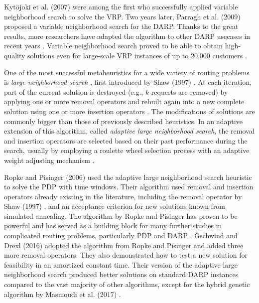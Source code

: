 Kytöjoki et al. (2007) \cite{KYTOJOKI2007} were among the first who successfully applied variable neighborhood search to solve the VRP. Two years later, Parragh et al. (2009) \cite{Parragh2009} proposed a variable neighborhood search for the DARP. Thanks to the great results, more researchers have adapted the algorithm to other DARP usecases in recent years \cite{SCHILDE2011, SCHILDE2014, MUELAS2013, MUELAS2015, Detti2017}. Variable neighborhood search proved to be able to obtain high-quality solutions even for large-scale VRP instances of up to 20,000 customers \cite{toth2015vrp}.


One of the most successful metaheuristics for a wide variety of routing problems is \emph{large neighborhood search} \cite{Gschwind2016}, first introduced by Shaw (1997) \cite{Shaw1997}. At each iteration, part of the current solution is destroyed (e.g., $k$ requests are removed) by applying one or more removal operators and rebuilt again into a new complete solution using one or more insertion operators \cite{darp-survey}. The modifications of solutions are commonly bigger than those of previously described heuristics. In an adaptive extension of this algorithm, called \emph{adaptive large neighborhood search}, the removal and insertion operators are selected based on their past performance during the search, usually by employing a roulette wheel selection process with an adaptive weight adjusting mechanism \cite{Azi2014, Gschwind2016, Masmoudi2020}.

Ropke and Pisinger (2006) \cite{Ropke2006} used the adaptive large neighborhood search heuristic to solve the PDP with time windows. Their algorithm used removal and insertion operators already existing in the literature, including the removal operator by Shaw (1997) \cite{Shaw1997}, and an acceptance criterion for new solutions known from simulated annealing. The algorithm by Ropke and Pisinger has proven to be powerful and has served as a building block for many further studies in complicated routing problems, particularly PDP and DARP \cite{Gschwind2016, Braekers2016, Masmoudi2016, Belhaiza2017, Drexl2018, Belhaiza2019, Masmoudi2020, Wang2020, Cauchi2020, Malheiros2021}. Gschwind and Drexl (2016) \cite{Gschwind2016} adopted the algorithm from Ropke and Pisinger and added three more removal operators. They also demonstrated how to test a new solution for feasibility in an amortized constant time. Their version of the adaptive large neighborhood search produced better solutions on standard DARP instances compared to the vast majority of other algorithms, except for the hybrid genetic algorithm by Masmoudi et al. (2017) \cite{Masmoudi2017}.

